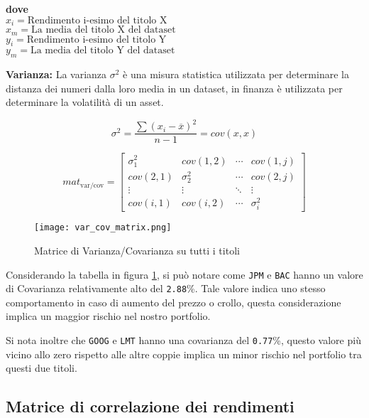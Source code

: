 \textbf{dove}\\
\(x_i = \text{Rendimento i-esimo del titolo X}\)\\
\(x_m = \text{La media del titolo X del dataset}\)\\
\(y_i = \text{Rendimento i-esimo del titolo Y}\)\\
\(y_m = \text{La media del titolo Y del dataset}\)

\textbf{Varianza:} La varianza \(\sigma^2\) è una misura statistica utilizzata per determinare la distanza dei numeri dalla loro media in un dataset, in finanza è utilizzata
per determinare la volatilità di un asset.

\begin{displaymath}
  \sigma^2 = \frac{\sum(x_i - \overline{x})^2}{n - 1}  = cov(x,x)
\end{displaymath}

\begin{displaymath}
  mat_{\text{var/cov}} = 
\begin{bmatrix}
  \sigma^2_1 & cov(1,2) & \cdots & cov(1,j)\\
  cov(2,1) & \sigma^2_2 & \cdots & cov(2,j)\\
  \vdots   & \vdots   & \ddots & \vdots\\
  cov(i,1) & cov(i,2) & \cdots & \sigma^2_i
\end{bmatrix}
\end{displaymath}

\begin{figure}[h]
  \centering
  \texttt{[image: var\_cov\_matrix.png]}
  \caption{Matrice di Varianza/Covarianza su tutti i titoli}
  \label{fig:var_cov_matrix}
\end{figure}

Considerando la tabella in figura \ref{fig:var_cov_matrix}, si può notare come \verb|JPM| e \verb|BAC| hanno un valore di Covarianza
relativamente alto del \verb|2.88|\%. Tale valore indica uno stesso comportamento in caso di aumento del prezzo o crollo, questa considerazione implica
un maggior rischio nel nostro portfolio.

Si nota inoltre che \verb|GOOG| e \verb|LMT| hanno una covarianza del \verb|0.77|\%, questo valore più vicino allo zero rispetto alle altre coppie implica
un minor rischio nel portfolio tra questi due titoli.


\subsection{Matrice di correlazione dei rendimenti}

